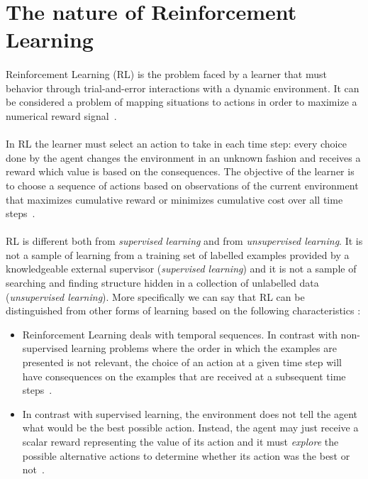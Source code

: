 \section{The nature of Reinforcement Learning}

\paragraph{} Reinforcement Learning (RL) is the problem faced by a learner that must behavior through trial-and-error interactions with a dynamic environment. It can be considered a problem of mapping situations to actions in order to maximize a numerical reward signal~\cite{RLDef1}.

\paragraph{} In RL the learner must select an action to take in each time step: every choice done by the agent changes the environment in an unknown fashion and receives a reward which value is based on the consequences. The objective of the learner is to choose a sequence of actions based on observations of the current environment that maximizes cumulative reward or minimizes cumulative cost over all time steps~\cite{LiMalik}.

\paragraph{} RL is different both from \textit{supervised learning} and from \textit{unsupervised learning}. It is not a sample of learning from a training set of labelled examples provided by a knowledgeable external supervisor (\textit{supervised learning}) and it is not a sample of searching and finding structure hidden in a collection of unlabelled data (\textit{unsupervised learning}). More specifically we can say that RL can be distinguished from other forms of learning based on the following characteristics :

\begin{itemize}
  \item Reinforcement Learning deals with temporal sequences. In contrast with non-supervised learning problems where the order in which the examples are presented is not relevant, the choice of an action at a given time step will have consequences on the examples that are received at a subsequent time steps~\cite{Sigaud:2010:MDP:1841781}.
  \item In contrast with supervised learning, the environment does not tell the agent what would be the best possible action. Instead, the agent may just receive a scalar reward representing the value of its action and it must \textit{explore} the possible alternative actions to determine whether its action was the best or not~\cite{Sigaud:2010:MDP:1841781}.
\end{itemize}

